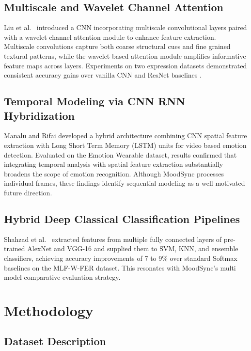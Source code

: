 \documentclass[conference]{IEEEtran}
\begin{document}
\subsection{Multiscale and Wavelet Channel Attention}
Liu et al.\ \cite{b4} introduced a CNN incorporating multiscale convolutional
layers paired with a wavelet channel attention module to enhance feature
extraction. Multiscale convolutions capture both coarse structural cues and
fine grained textural patterns, while the wavelet based attention module
amplifies informative feature maps across layers. Experiments on two
expression datasets demonstrated consistent accuracy gains over vanilla
CNN and ResNet baselines \cite{b4}.

\subsection{Temporal Modeling via CNN RNN Hybridization}
Manalu and Rifai \cite{b5} developed a hybrid architecture combining CNN
spatial feature extraction with Long Short Term Memory (LSTM) units for
video based emotion detection. Evaluated on the Emotion Wearable dataset,
results confirmed that integrating temporal analysis with spatial feature
extraction substantially broadens the scope of emotion recognition. Although
MoodSync processes individual frames, these findings identify sequential
modeling as a well motivated future direction.

\subsection{Hybrid Deep Classical Classification Pipelines}
Shahzad et al.\ \cite{b6} extracted features from multiple fully connected
layers of pre-trained AlexNet and VGG-16 and supplied them to SVM, KNN, and
ensemble classifiers, achieving accuracy improvements of 7 to 9\% over
standard Softmax baselines on the MLF-W-FER dataset. This resonates with
MoodSync's multi model comparative evaluation strategy.

\section{Methodology}

\subsection{Dataset Description}
\end{document}
